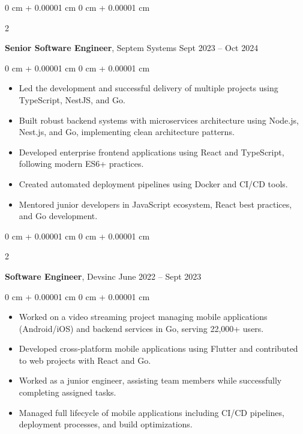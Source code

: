 \documentclass[10pt, letterpaper]{article}
\newenvironment{highlights}{
    \begin{itemize}[
        topsep=0.10 cm,
        parsep=0.10 cm,
        partopsep=0pt,
        itemsep=0pt,
        leftmargin=0 cm + 10pt
    ]
}{
    \end{itemize}
} %
\newenvironment{onecolentry}{
    \begin{adjustwidth}{
        0 cm + 0.00001 cm
    }{
        0 cm + 0.00001 cm
    }
}{
    \end{adjustwidth}
} %
\newenvironment{twocolentry}[2][]{
    \onecolentry
    \def\secondColumn{#2}
    \setcolumnwidth{\fill, 4.5 cm}
    \begin{paracol}{2}
}{
    \switchcolumn \raggedleft \secondColumn
    \end{paracol}
    \endonecolentry
} %
\begin{document}
    \vspace{0.2 cm}

    \begin{twocolentry}{
        Sept 2023 – Oct 2024
    }
        \textbf{Senior Software Engineer}, Septem Systems\end{twocolentry}

    \vspace{0.10 cm}
    \begin{onecolentry}
        \begin{highlights}
            \item Led the development and successful delivery of multiple projects using TypeScript, NestJS, and Go.
            \item Built robust backend systems with microservices architecture using Node.js, Nest.js, and Go, implementing clean architecture patterns.
            \item Developed enterprise frontend applications using React and TypeScript, following modern ES6+ practices.
            \item Created automated deployment pipelines using Docker and CI/CD tools.
            \item Mentored junior developers in JavaScript ecosystem, React best practices, and Go development.
        \end{highlights}
    \end{onecolentry}

    \vspace{0.2 cm}

    \begin{twocolentry}{
        June 2022 – Sept 2023
    }
        \textbf{Software Engineer}, Devsinc\end{twocolentry}

    \vspace{0.10 cm}
    \begin{onecolentry}
        \begin{highlights}
            \item Worked on a video streaming project managing mobile applications (Android/iOS) and backend services in Go, serving 22,000+ users.
            \item Developed cross-platform mobile applications using Flutter and contributed to web projects with React and Go.
            \item Worked as a junior engineer, assisting team members while successfully completing assigned tasks.
            \item Managed full lifecycle of mobile applications including CI/CD pipelines, deployment processes, and build optimizations.
        \end{highlights}
    \end{onecolentry}
\end{document}
